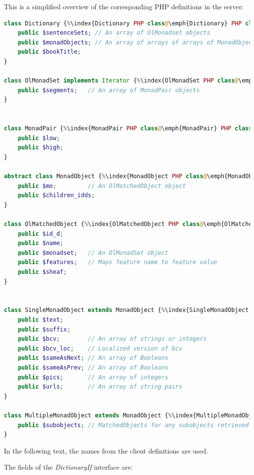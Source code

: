 \documentclass[11pt,oneside,a4paper]{memoir}
\begin{document}
This is a simplified overview of the corresponding PHP definitions in the server:

\begin{lstlisting}[language=PHP]
class Dictionary {%\index{Dictionary PHP class@\emph{Dictionary} PHP class}%
    public $sentenceSets; // An array of OlMonadset objects
    public $monadObjects; // An array of arrays of arrays of MonadObject objects
    public $bookTitle;
}

class OlMonadSet implements Iterator {%\index{OlMonadSet PHP class@\emph{OlMonadSet} PHP class}%
    public $segments;   // An array of MonadPair objects
}


class MonadPair {%\index{MonadPair PHP class@\emph{MonadPair} PHP class}%
    public $low;
    public $high;
}

abstract class MonadObject {%\index{MonadObject PHP class@\emph{MonadObject} PHP class}%
    public $mo;         // An OlMatchedObject object
    public $children_idds;
}

class OlMatchedObject {%\index{OlMatchedObject PHP class@\emph{OlMatchedObject} PHP class}%
    public $id_d;
    public $name;
    public $monadset;   // An OlMonadSet object
    public $features;   // Maps feature name to feature value
    public $sheaf;
}


class SingleMonadObject extends MonadObject {%\index{SingleMonadObject PHP class@\emph{SingleMonadObject} PHP class}%
    public $text;
    public $suffix;
    public $bcv;        // An array of strings or integers
    public $bcv_loc;    // Localized version of bcv
    public $sameAsNext; // An array of Booleans
    public $sameAsPrev; // An array of Booleans
    public $pics;       // An array of integers
    public $urls;       // An array of string pairs
}

class MultipleMonadObject extends MonadObject {%\index{MultipleMonadObject PHP class@\emph{MultipleMonadObject} PHP class}%
    public $subobjects; // MatchedObjects for any subobjects retrieved for this MultipleMonadObject
}
\end{lstlisting}

In the following text, the names from the client definitions are used.

The fields of the \emph{DictionaryIf} interface are:
\end{document}
